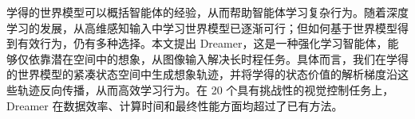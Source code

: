 学得的世界模型可以概括智能体的经验，从而帮助智能体学习复杂行为。随着深度学习的发展，从高维感知输入中学习世界模型已逐渐可行；但如何基于世界模型得到有效行为，仍有多种选择。本文提出 Dreamer，这是一种强化学习智能体，能够仅依靠潜在空间中的想象，从图像输入解决长时程任务。具体而言，我们在学得的世界模型的紧凑状态空间中生成想象轨迹，并将学得的状态价值的解析梯度沿这些轨迹反向传播，从而高效学习行为。在 20 个具有挑战性的视觉控制任务上，Dreamer 在数据效率、计算时间和最终性能方面均超过了已有方法。
